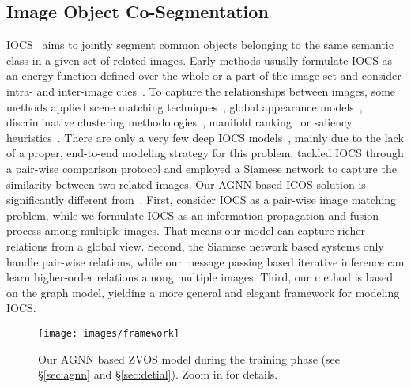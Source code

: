 \documentclass[10pt,twocolumn,letterpaper]{article}
\begin{document}
\subsection{Image Object Co-Segmentation}
	\vspace*{-2pt}	
\label{sec:coseg}
IOCS~\cite{rother2006cosegmentation,Mukherjee2009,Hochbaum2009} aims to jointly segment common objects belonging to the same semantic class in a given set of related images. Early methods usually formulate IOCS as an energy function defined over the whole or a part of the image set and consider intra- and inter-image cues~\cite{Vicente2010CosegmentationRM,Kim2011,Rubio2012,vicente2011object}.
To capture the relationships between images, some methods applied scene matching techniques~\cite{Rubinstein_2013_CVPR}, global appearance models~\cite{wang2016higher}, discriminative clustering methodologies~\cite{joulin2010discriminative}, manifold ranking~\cite{quan2016object}  or saliency heuristics~\cite{han2018,tao2017image}.
There are only a very few deep IOCS models~\cite{chen2018semantic,DBLP:journals/corr/abs-1804-06423}, mainly due to the lack of a proper, end-to-end modeling strategy for this problem.  \cite{chen2018semantic,DBLP:journals/corr/abs-1804-06423} tackled IOCS through a pair-wise comparison protocol and employed a Siamese network to capture the similarity between two related images.
Our AGNN based ICOS solution is significantly different from~\cite{chen2018semantic,DBLP:journals/corr/abs-1804-06423}. First, \cite{chen2018semantic,DBLP:journals/corr/abs-1804-06423} consider IOCS as a pair-wise image matching problem, while we formulate IOCS as an information propagation and fusion process among multiple images. That means our model can capture richer relations from a global view. Second, the Siamese network based systems only handle pair-wise relations, while our message passing based iterative inference can learn higher-order relations among multiple images. Third, our method is based on the graph model, yielding a more general and elegant framework for modeling IOCS.

\begin{figure*}[t]
\centering
      \texttt{[image: images/framework]}
\vspace{-20pt}
\caption{\small Our AGNN based ZVOS model during the training phase (see \S\ref{sec:agnn} and \S\ref{sec:detial}). \small Zoom in for details. }
\label{fig:model}
\vspace{-12pt}
\end{figure*}
\end{document}
